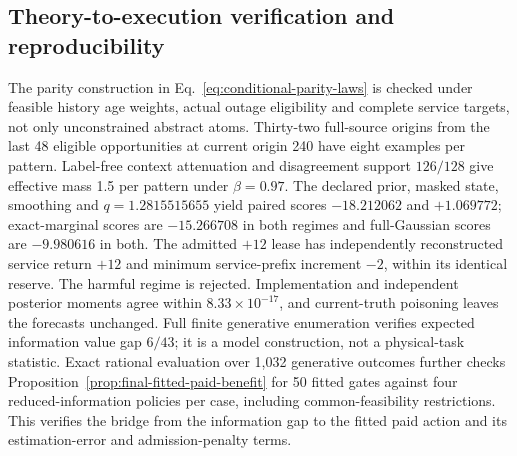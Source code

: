 \documentclass[10pt]{article}
\begin{document}
\subsection{Theory-to-execution verification and reproducibility}
The parity construction in Eq.~\eqref{eq:conditional-parity-laws} is checked
under feasible history age weights, actual outage eligibility and complete
service targets, not only unconstrained abstract atoms. Thirty-two
full-source origins from the last 48 eligible opportunities at current
origin 240 have eight examples per pattern. Label-free context attenuation
and disagreement support $126/128$ give effective mass 1.5 per pattern
under $\beta=0.97$. The declared prior, masked state, smoothing and
$q=1.2815515655$ yield paired scores $-18.212062$ and $+1.069772$;
exact-marginal scores are $-15.266708$ in both regimes and full-Gaussian
scores are $-9.980616$ in both. The admitted $+12$ lease has independently
reconstructed service return $+12$ and minimum service-prefix increment
$-2$, within its identical reserve. The harmful regime is rejected.
Implementation and independent posterior moments agree within
$8.33\times10^{-17}$, and current-truth poisoning leaves the forecasts
unchanged. Full finite generative enumeration verifies expected information
value gap $6/43$; it is a model construction, not a physical-task statistic.
Exact rational evaluation over 1,032 generative outcomes further checks
Proposition~\ref{prop:final-fitted-paid-benefit} for 50 fitted gates against
four reduced-information policies per case, including common-feasibility
restrictions. This verifies the bridge from the information gap to the
fitted paid action and its estimation-error and admission-penalty terms.
\end{document}

